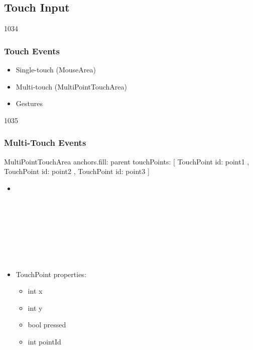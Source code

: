 \subsection{Touch Input}
\begin{slide}{1034}\frametitle{Touch Events}

\begin{itemize}
\item Single-touch (MouseArea)
\item Multi-touch (MultiPointTouchArea)
\item Gestures
\end{itemize}

\end{slide}

\begin{slide}[fragile]{1035}\frametitle{Multi-Touch Events}

\begin{EXCLUDE}
MultiPointTouchArea {
  anchors.fill: parent
  touchPoints: [
      TouchPoint { id: point1 },
      TouchPoint { id: point2 },
      TouchPoint { id: point3 }
  ]
}
\end{EXCLUDE}

\begin{itemize}
\item[]
\begin{qml}
\\
\\
\qtt{~~\qc{type}{touchPoints}:~[}\\
\\
\\
\\
\qtt{~~]}\\
\qtt{\}}\\
\end{qml}\bigskip
\item[] TouchPoint properties:
  \begin{itemize}
  \item int x
  \item int y
  \item bool pressed
  \item int pointId
  \end{itemize}
\end{itemize}
\end{slide}

